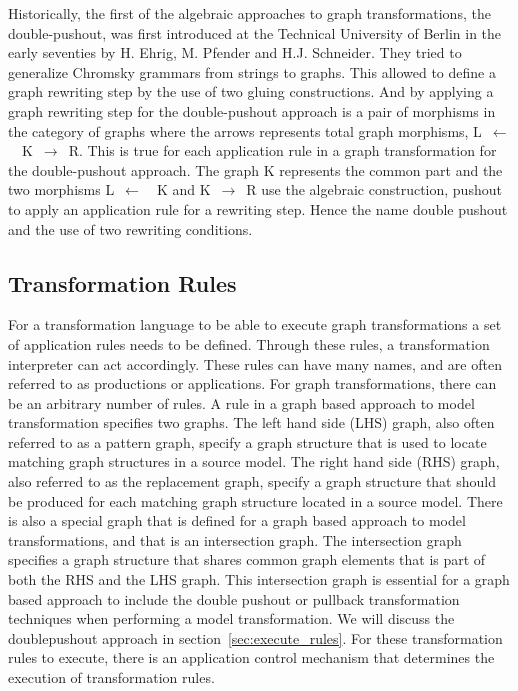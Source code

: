 Historically, the first of the algebraic approaches to graph
transformations, the double-pushout, was first introduced at the Technical
University of Berlin in the early seventies by H. Ehrig, M. Pfender and H.J.
Schneider\cite{INSPEC:606170}. They tried to generalize Chromsky grammars from
strings to graphs. This allowed to define a graph rewriting step by the use of
two gluing constructions. And by applying a graph rewriting step for the
double-pushout approach is a pair of morphisms in the category of graphs where
the arrows represents total graph morphisms, \mbox{L $\longleftarrow$
\ K $\longrightarrow$ R}. This is true for each application rule in a graph
transformation for the double-pushout approach. The graph K represents the
common part and the two morphisms \mbox{L $\longleftarrow$ \ K} and \mbox{K
$\longrightarrow$ R} use the algebraic construction, pushout to apply an
application rule for a rewriting step. Hence the name double pushout and the use
of two rewriting conditions.

\subsection{Transformation Rules}
For a transformation language to be able to execute graph
transformations a set of application rules needs to be defined. Through these
rules, a transformation interpreter can act accordingly. These rules can have
many names, and are often referred to as productions or applications. For graph
transformations, there can be an arbitrary number of rules. A rule in a graph
based approach to model transformation specifies two graphs. The left hand side
(LHS) graph, also often referred to as a pattern graph, specify a graph
structure that is used to locate matching graph structures in a source model.
The right hand side (RHS) graph, also referred to as the replacement graph,
specify a graph structure that should be produced for each matching graph
structure located in a source model. There is also a special graph that is
defined for a graph based approach to model transformations, and that is an
intersection graph. The intersection graph specifies a graph structure that
shares common graph elements that is part of both the RHS and the LHS graph.
This intersection graph is essential for a graph based approach to include the
double pushout or pullback transformation techniques when performing a model
transformation. We will discuss the doublepushout approach in
section~\ref{sec:execute_rules}. For these transformation rules to execute,
there is an application control mechanism that determines the execution of
transformation rules.

